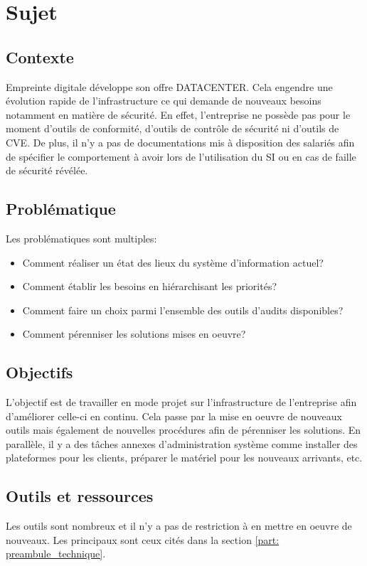 \documentclass[12pt, a4paper, twoside]{article}
\begin{document}
\newpage
\section{Sujet}
\subsection{Contexte}
Empreinte digitale développe son offre DATACENTER. 
Cela engendre une évolution rapide de l'infrastructure ce qui demande de nouveaux besoins notamment en matière de sécurité. 
En effet, l'entreprise ne possède pas pour le moment d'outils de conformité, d'outils de contrôle de sécurité ni d'outils de \gls{CVE}. 
De plus, il n'y a pas de documentations mis à disposition des salariés afin de spécifier le comportement à avoir lors de l'utilisation du \gls{SI} ou en cas de faille de sécurité révélée.

\subsection{Problématique}
Les problématiques sont multiples:
\begin{itemize}
    \item Comment réaliser un état des lieux du système d'information actuel?
    \item Comment établir les besoins en hiérarchisant les priorités?
    \item Comment faire un choix parmi l'ensemble des outils d'audits disponibles?
    \item Comment pérenniser les solutions mises en oeuvre? 
\end{itemize}

\subsection{Objectifs}
L'objectif est de travailler en mode projet sur l'infrastructure de l'entreprise afin d'améliorer celle-ci en continu. 
Cela passe par la mise en oeuvre de nouveaux outils mais également de nouvelles procédures afin de pérenniser les solutions. 
En parallèle, il y a des tâches annexes d'administration système comme installer des plateformes pour les clients, préparer le matériel pour les nouveaux arrivants, etc.

\subsection{Outils et ressources}
Les outils sont nombreux et il n'y a pas de restriction à en mettre en oeuvre de nouveaux. 
Les principaux sont ceux cités dans la section \ref{part: preambule_technique}.
\end{document}
